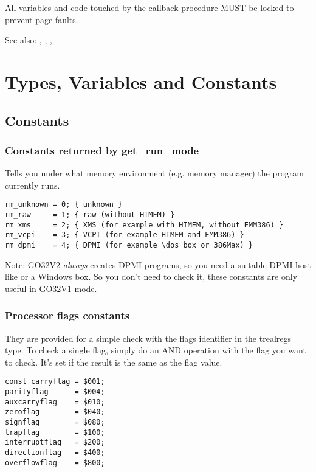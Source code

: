 All variables and code touched by the callback procedure MUST be locked to
prevent page faults.

See also: ,
, 
, 

\section{Types, Variables and Constants}

\subsection{Constants}

\subsubsection{Constants returned by get\_run\_mode}

Tells you under what memory environment (e.g. memory manager) the program
currently runs.
\begin{verbatim}
rm_unknown = 0; { unknown }
rm_raw     = 1; { raw (without HIMEM) } 
rm_xms     = 2; { XMS (for example with HIMEM, without EMM386) } 
rm_vcpi    = 3; { VCPI (for example HIMEM and EMM386) } 
rm_dpmi    = 4; { DPMI (for example \dos box or 386Max) }
\end{verbatim}

Note: GO32V2 {\em always} creates DPMI programs, so you need a suitable DPMI
host like  or a Windows \dos box. So you don't need to check it,
these constants are only useful in GO32V1 mode.

\subsubsection{Processor flags constants}

They are provided for a simple check with the flags identifier in the
trealregs type. To check a single flag, simply do an AND operation with the
flag you want to check. It's set if the result is the same as the flag
value.

\begin{verbatim}
const carryflag = $001; 
parityflag      = $004; 
auxcarryflag    = $010; 
zeroflag        = $040; 
signflag        = $080; 
trapflag        = $100; 
interruptflag   = $200;
directionflag   = $400; 
overflowflag    = $800;
\end{verbatim}

